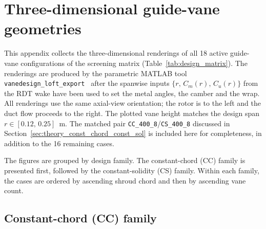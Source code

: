 \chapter{Three-dimensional guide-vane geometries}
\label{app:gv_3d_geometries}
\fancyhead{}

This appendix collects the three-dimensional renderings of all 18 active guide-vane configurations of the screening matrix (Table~\ref{tab:design_matrix}). The renderings are produced by the parametric MATLAB tool \texttt{vanedesign\_loft\_export}~\cite{Leonsen2025} after the spanwise inputs $\{r,\,C_m(r),\,C_u(r)\}$ from the RDT wake have been used to set the metal angles, the camber and the wrap. All renderings use the same axial-view orientation; the rotor is to the left and the duct flow proceeds to the right. The plotted vane height matches the design span $r \in [0.12,\,0.25]$~m. The matched pair \texttt{CC\_400\_8}/\texttt{CS\_400\_8} discussed in Section~\ref{sec:theory_const_chord_const_sol} is included here for completeness, in addition to the 16 remaining cases.

The figures are grouped by design family. The constant-chord (CC) family is presented first, followed by the constant-solidity (CS) family. Within each family, the cases are ordered by ascending shroud chord and then by ascending vane count.

\section*{Constant-chord (CC) family}

